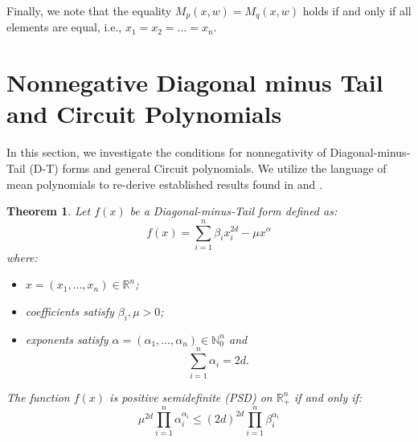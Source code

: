 \documentclass{article}
\newtheorem{theorem}{Theorem}
\begin{document}
Finally, we note that the equality $M_p(x, w) = M_q(x, w)$ holds if and only if all elements are equal, i.e., 
$x_1 = x_2 = \dots = x_n$.

\section{Nonnegative Diagonal minus Tail and Circuit Polynomials}\label{s03}

In this section, we investigate the conditions for nonnegativity of Diagonal-minus-Tail (D-T) forms and general 
Circuit polynomials. We utilize the language of mean polynomials to re-derive established results 
found in \cite{GM01} and \cite{DIdW01}.

\begin{theorem}\label{thm:DT_PSD}
Let $f(x)$ be a Diagonal-minus-Tail form defined as:
\[
   f(x) = \sum_{i=1}^n \beta_i x_i^{2d} - \mu x^{\alpha}
\]
where:
\begin{itemize}
     \item $x = (x_1, \dots, x_n) \in \mathbb{R}^n$;
     \item coefficients satisfy $\beta_i, \mu > 0$;
     \item exponents satisfy $\alpha = (\alpha_1, \dots, \alpha_n) \in \mathbb{N}_0^n$ and
     \[
         \sum_{i=1}^n \alpha_i = 2d.
     \]
\end{itemize}
The function $f(x)$ is positive semidefinite (PSD) on $\mathbb{R}_+^n$ if and only if:
\[
   \mu^{2d} \prod_{i=1}^n \alpha_i^{\alpha_i} \leq (2d)^{2d} \prod_{i=1}^n \beta_i^{\alpha_i}
\]
\end{theorem}
\end{document}
